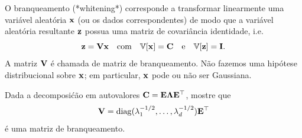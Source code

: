 \begin{exenumerate}
    
    \item O branqueamento (*whitening*) corresponde a transformar linearmente uma vari\'avel aleat\'oria
    $\mathbf{x}$ (ou os dados correspondentes) de modo que a vari\'avel aleat\'oria resultante $\mathbf{z}$ possua uma matriz de covari\^ancia identidade, i.e.\ 
    $$\mathbf{z} = \mathbf{V} \mathbf{x} \quad \text{com} \quad \mathbb{V}[\mathbf{x}] = \mathbf{C} \quad
    \text{e}\quad \mathbb{V}[\mathbf{z}] = \mathbf{I}. $$ A matriz $\mathbf{V}$ \'e chamada de
    matriz de branqueamento. N\~ao fazemos uma hip\'otese distribucional sobre
    $\mathbf{x}$; em particular, $\mathbf{x}$ pode ou n\~ao ser Gaussiana.
    
    Dada a decomposi\'c\~ao em autovalores $\mathbf{C} = \mathbf{E} \mathbf{\Lambda} \mathbf{E}^\top$,
    mostre que
    \begin{equation}
        \mathbf{V} = \operatorname{diag} (\lambda_1^{-1/2}, \ldots,  \lambda_d^{-1/2}) \mathbf{E}^\top
    \end{equation}
    \'e uma matriz de branqueamento.
    

\end{exenumerate}
